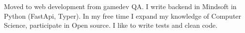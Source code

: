 \hspace{0.2in}Moved to web development from gamedev QA. I write backend in Mindsoft in Python (FastApi, Typer). In my free time I expand my knowledge of Computer Science, participate in Open source. I like to write tests and clean code.
